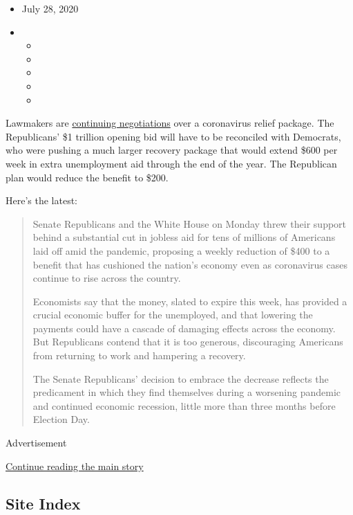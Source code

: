 \begin{itemize}
\item
  July 28, 2020
\item
  \begin{itemize}
  \item
  \item
  \item
  \item
  \item
  \end{itemize}
\end{itemize}

Lawmakers are
\href{https://www.nytimes.com/2020/07/27/us/politics/republicans-jobless-aid.html}{continuing
negotiations} over a coronavirus relief package. The Republicans' \$1
trillion opening bid will have to be reconciled with Democrats, who were
pushing a much larger recovery package that would extend \$600 per week
in extra unemployment aid through the end of the year. The Republican
plan would reduce the benefit to \$200.

Here's the latest:

\begin{quote}
Senate Republicans and the White House on Monday threw their support
behind a substantial cut in jobless aid for tens of millions of
Americans laid off amid the pandemic, proposing a weekly reduction of
\$400 to a benefit that has cushioned the nation's economy even as
coronavirus cases continue to rise across the country.

Economists say that the money, slated to expire this week, has provided
a crucial economic buffer for the unemployed, and that lowering the
payments could have a cascade of damaging effects across the economy.
But Republicans contend that it is too generous, discouraging Americans
from returning to work and hampering a recovery.

The Senate Republicans' decision to embrace the decrease reflects the
predicament in which they find themselves during a worsening pandemic
and continued economic recession, little more than three months before
Election Day.
\end{quote}

Advertisement

\protect\hyperlink{after-bottom}{Continue reading the main story}

\hypertarget{site-index}{%
\subsection{Site Index}\label{site-index}}


